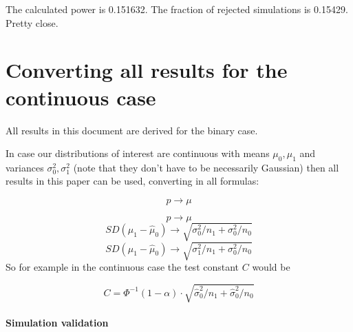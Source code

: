 \documentclass[
]{article}
\begin{document}
The calculated power is 0.151632. The fraction of rejected simulations
is 0.15429. Pretty close.

\hypertarget{converting-all-results-for-the-continuous-case}{%
\section{Converting all results for the continuous
case}\label{converting-all-results-for-the-continuous-case}}

All results in this document are derived for the binary case.

In case our distributions of interest are continuous with means
\(\mu_0, \mu_1\) and variances \(\sigma^2_0, \sigma^2_1\) (note that
they don't have to be necessarily Gaussian) then all results in this
paper can be used, converting in all formulas:

\[p \rightarrow \mu\]

\[p \rightarrow \mu\]
\[SD(\hat{\mu}_1-\hat{\mu}_0) \rightarrow \sqrt{\sigma^2_0/n_1 + \sigma^2_0/n_0}\]
\[SD(\hat{\mu}_1-\hat{\mu}_0) \rightarrow \sqrt{\sigma^2_1/n_1 + \sigma^2_0/n_0}\]
So for example in the continuous case the test constant \(C\) would be

\[\boxed{C = \Phi^{-1}(1 - \alpha) \cdot \sqrt{\hat{\sigma}^2_0/n_1 + \hat{\sigma}^2_0/n_0}}\]

\hypertarget{simulation-validation-7}{%
\paragraph{Simulation validation}\label{simulation-validation-7}}
\end{document}
